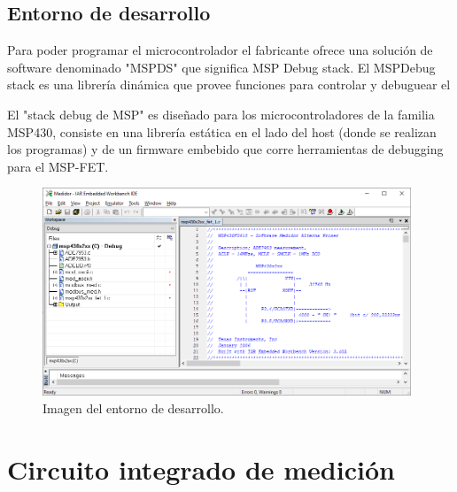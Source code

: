 

\subsection{Entorno de desarrollo}

Para poder programar el microcontrolador el fabricante ofrece una solución de software denominado "MSPDS" que significa MSP Debug stack. El MSPDebug stack es una librería dinámica que provee funciones para controlar y debuguear el



El "stack debug de MSP" es diseñado para los microcontroladores de la familia MSP430, consiste en una librería estática en el lado del host (donde se realizan los programas) y de un firmware embebido que corre herramientas de debugging para el MSP-FET.\cite{GuideMSPStack}

\begin{figure}[h]
	\centering
	\includegraphics[width=110mm,keepaspectratio]{Figures/Embeddedworkbench.png}
	\caption{Imagen del entorno de desarrollo.}
	\label{fig:IARwindow}
\end{figure}


\section{Circuito integrado de medición}
\label{sec:cap2parte3}

